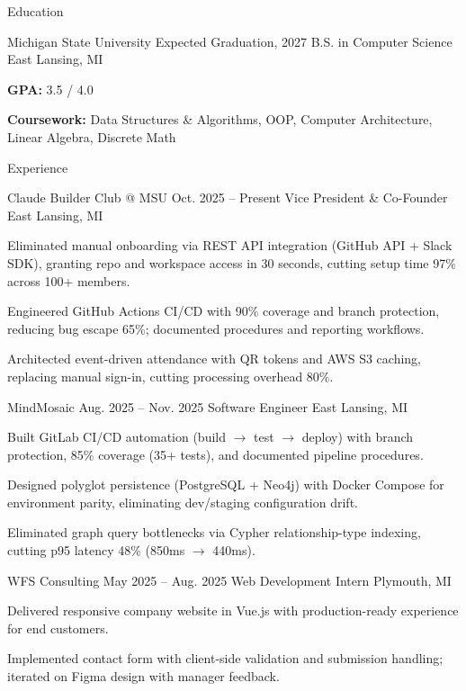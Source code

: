 \documentclass[
	11pt
]{../../../resume}
\begin{document}
	\begin{rSection}{E}{ducation}
		\begin{rSectionEntry}
			{Michigan State University}
			{Expected Graduation, 2027}
			{B.S. in Computer Science}
			{}
			{East Lansing, MI}

			\item \textbf{GPA:} 3.5 / 4.0
			\item \textbf{Coursework:} Data Structures \& Algorithms, OOP, Computer Architecture, Linear Algebra, Discrete Math
		\end{rSectionEntry}
	\end{rSection}

	\begin{rSection}{E}{xperience}
		\begin{rSectionEntry}
			{Claude Builder Club @ MSU}
			{Oct. 2025 -- Present}
			{Vice President \& Co-Founder}
			{}
			{East Lansing, MI}

			\item Eliminated manual onboarding via REST API integration (GitHub API + Slack SDK), granting repo and workspace access in 30 seconds, cutting setup time 97\% across 100+ members.
			\item Engineered GitHub Actions CI/CD with 90\% coverage and branch protection, reducing bug escape 65\%; documented procedures and reporting workflows.
			\item Architected event-driven attendance with QR tokens and AWS S3 caching, replacing manual sign-in, cutting processing overhead 80\%.
		\end{rSectionEntry}

		\begin{rSectionEntry}
			{MindMosaic}
			{Aug. 2025 -- Nov. 2025}
			{Software Engineer}
			{}
			{East Lansing, MI}

			\item Built GitLab CI/CD automation (build $\rightarrow$ test $\rightarrow$ deploy) with branch protection, 85\% coverage (35+ tests), and documented pipeline procedures.
			\item Designed polyglot persistence (PostgreSQL + Neo4j) with Docker Compose for environment parity, eliminating dev/staging configuration drift.
			\item Eliminated graph query bottlenecks via Cypher relationship-type indexing, cutting p95 latency 48\% (850ms $\rightarrow$ 440ms).
		\end{rSectionEntry}

		\begin{rSectionEntry}
			{WFS Consulting}
			{May 2025 -- Aug. 2025}
			{Web Development Intern}
			{}
			{Plymouth, MI}

			\item Delivered responsive company website in Vue.js with production-ready experience for end customers.
			\item Implemented contact form with client-side validation and submission handling; iterated on Figma design with manager feedback.
		\end{rSectionEntry}
	\end{rSection}
\end{document}
